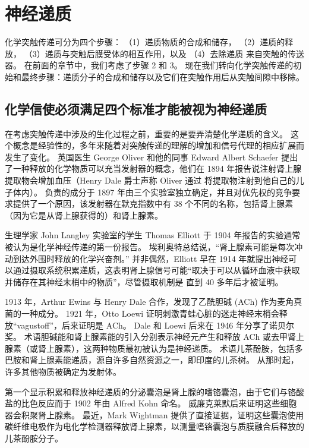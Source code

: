 \chapter{神经递质} \label{chap:chap16}

化学突触传递可分为四个步骤：
（1）递质物质的合成和储存，
（2）递质的释放，
（3）递质与突触后膜受体的相互作用，以及
（4）去除递质 来自突触的传送器。
在前面的章节中，我们考虑了步骤 2 和 3。
现在我们转向化学突触传递的初始和最终步骤：递质分子的合成和储存以及它们在突触作用后从突触间隙中移除。



\section{化学信使必须满足四个标准才能被视为神经递质}

在考虑突触传递中涉及的生化过程之前，重要的是要弄清楚化学递质的含义。
这个概念是经验性的，多年来随着对突触传递的理解的增加和信号代理的相应扩展而发生了变化。
英国医生 George Oliver 和他的同事 Edward Albert Schaefer 提出了一种释放的化学物质可以充当发射器的概念，他们在 1894 年报告说注射肾上腺提取物会增加血压（Henry Dale 爵士声称 Oliver 通过 将提取物注射到他自己的儿子体内）。
负责的成分于 1897 年由三个实验室独立确定，并且对优先权的竞争要求提供了一个原因，该发射器在默克指数中有 38 个不同的名称，包括肾上腺素（因为它是从肾上腺获得的）和肾上腺素。


生理学家 John Langley 实验室的学生 Thomas Elliott 于 1904 年报告的实验通常被认为是化学神经传递的第一份报告。
埃利奥特总结说，“肾上腺素可能是每次冲动到达外围时释放的化学兴奋剂。” 
并非偶然，Elliott 早在 1914 年就提出神经可以通过摄取系统积累递质，这表明肾上腺信号可能“取决于可以从循环血液中获取并储存在其神经末梢中的物质”，尽管摄取机制是 直到 40 多年后才被证明。


1913 年，Arthur Ewins 与 Henry Dale 合作，发现了乙酰胆碱 (ACh) 作为麦角真菌的一种成分。
1921 年，Otto Loewi 证明刺激青蛙心脏的迷走神经末梢会释放“vagustoff”，后来证明是 ACh。
Dale 和 Loewi 后来在 1946 年分享了诺贝尔奖。
术语胆碱能和肾上腺素能的引入分别表示神经元产生和释放 ACh 或去甲肾上腺素（或肾上腺素），这两种物质最初被认为是神经递质。
术语儿茶酚胺，包括多巴胺和肾上腺素能递质，源自许多自然资源之一，即印度的儿茶树。
从那时起，许多其他物质被确定为发射体。


第一个显示积累和释放神经递质的分泌囊泡是肾上腺的嗜铬囊泡，由于它们与铬酸盐的比色反应而于 1902 年由 Alfred Kohn 命名。
威廉克莱默后来证明这些细胞器会积聚肾上腺素。
最近，Mark Wightman 提供了直接证据，证明这些囊泡使用碳纤维电极作为电化学检测器释放肾上腺素，以测量嗜铬囊泡与质膜融合后释放的儿茶酚胺分子。


